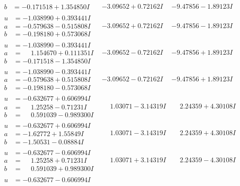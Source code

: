 \documentclass[1p]{elsarticle_modified}
\theoremstyle{definition}
\begin{document}
$$\begin{array}{c|c|c}
\begin{aligned}
b &= -0.171518 + 1.354850 I\end{aligned}
 & -3.09652 + 0.72162 I & -9.47856 - 1.89123 I \\ \hline\begin{aligned}
u &= -1.038990 + 0.393441 I \\
a &= -0.579638 - 0.515808 I \\
b &= -0.198180 + 0.573068 I\end{aligned}
 & -3.09652 + 0.72162 I & -9.47856 - 1.89123 I \\ \hline\begin{aligned}
u &= -1.038990 - 0.393441 I \\
a &= \phantom{-}1.154670 + 0.111351 I \\
b &= -0.171518 - 1.354850 I\end{aligned}
 & -3.09652 - 0.72162 I & -9.47856 + 1.89123 I \\ \hline\begin{aligned}
u &= -1.038990 - 0.393441 I \\
a &= -0.579638 + 0.515808 I \\
b &= -0.198180 - 0.573068 I\end{aligned}
 & -3.09652 - 0.72162 I & -9.47856 + 1.89123 I \\ \hline\begin{aligned}
u &= -0.632677 + 0.606994 I \\
a &= \phantom{-}1.25258 - 0.71231 I \\
b &= \phantom{-}0.591039 - 0.989300 I\end{aligned}
 & \phantom{-}1.03071 - 3.14319 I & \phantom{-}2.24359 + 4.30108 I \\ \hline\begin{aligned}
u &= -0.632677 + 0.606994 I \\
a &= -1.62772 + 1.55849 I \\
b &= -1.50531 - 0.08884 I\end{aligned}
 & \phantom{-}1.03071 - 3.14319 I & \phantom{-}2.24359 + 4.30108 I \\ \hline\begin{aligned}
u &= -0.632677 - 0.606994 I \\
a &= \phantom{-}1.25258 + 0.71231 I \\
b &= \phantom{-}0.591039 + 0.989300 I\end{aligned}
 & \phantom{-}1.03071 + 3.14319 I & \phantom{-}2.24359 - 4.30108 I \\ \hline\begin{aligned}
u &= -0.632677 - 0.606994 I \\

\end{aligned}
\end{array}$$
\end{document}
